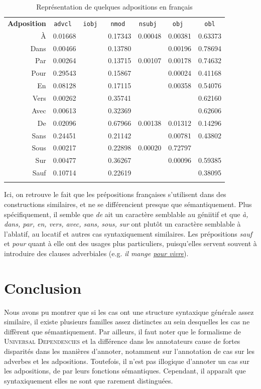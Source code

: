 \documentclass{cours}
\begin{document}
\begin{table}[H]
	\centering
	\renewcommand{\arraystretch}{1.3}
	\begin{NiceTabular}{>{\sc}rcccccc}
		\bf Adposition & \tt advcl &\tt iobj & \tt nmod & \tt nsubj & \tt obj & \tt obl\\
		À    & 0.01668 &  & 0.17343 & 0.00048 & 0.00381 & 0.63373\\
		Dans & 0.00466 & & 0.13780 &  & 0.00196 & 0.78694\\
		Par  & 0.00264 &  & 0.13715 & 0.00107 & 0.00178 & 0.74632\\
		Pour & 0.29543 & & 0.15867 &  & 0.00024 & 0.41168\\
		En   & 0.08128 &  & 0.17115 & & 0.00358 & 0.54076\\
		Vers & 0.00262 &  & 0.35741 & & & 0.62160\\
		Avec & 0.00613 & & 0.32369 &  &  & 0.62606\\
		De   & 0.02096 &  & 0.67966 & 0.00138 & 0.01312 & 0.14296\\
		Sans & 0.24451 & & 0.21142 & & 0.00781 & 0.43802\\
		Sous & 0.00217 & & 0.22898 & 0.00020 & 0.72797 & \\
		Sur  & 0.00477 & & 0.36267 &  & 0.00096 & 0.59385\\
		Sauf & 0.10714 & & 0.22619 & & & 0.38095\\
	\CodeAfter
	\end{NiceTabular}
	\caption{Représentation de quelques adpositions en français}
	\label{tab:adpos_fr}
\end{table}
Ici, on retrouve le fait que les prépositions françaises s'utilisent dans des constructions similaires, et ne se différencient presque que sémantiquement.
Plus spécifiquement, il semble que \textsl{de} ait un caractère semblable au géniitif et que \textsl{à, dans, par, en, vers, avec, sans, sous, sur} ont plutôt un caractère semblable à l'ablatif, au locatif et autres cas syntaxiquement similaires.
Les prépositions \textsl{sauf} et \textsl{pour} quant à elle ont des usages plus particuliers, puisqu'elles servent souvent à introduire des clauses adverbiales (e.g. \textsl{il mange \ul{\emph{pour} vivre}}).

\section{Conclusion}
Nous avons pu montrer que si les cas ont une structure syntaxique générale assez similaire, il existe plusieurs familles assez distinctes au sein desquelles les cas ne diffèrent que sémantiquement.
Par ailleurs, il faut noter que le formalisme de \textsc{Universal Dependencies} et la différence dans les annotateurs cause de fortes disparités dans les manières d'annoter, notamment sur l'annotation de cas sur les adverbes et les adpositions.
Toutefois, il n'est pas illogique d'annoter un cas sur les adpositions, de par leurs fonctions sémantiques. Cependant, il apparaît que syntaxiquement elles ne sont que rarement distinguées.


\newpage
\appendix




\appendix
\listoftables
\listoffigures
\end{document}
